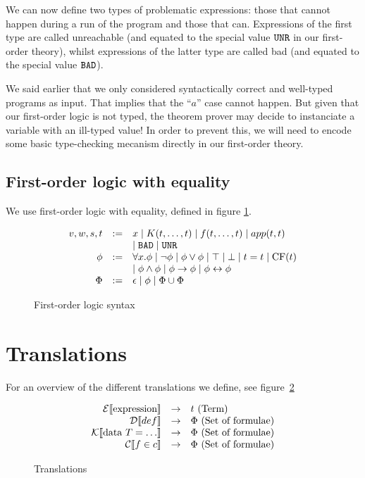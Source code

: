 \documentclass[preprint]{sigplanconf}
\begin{document}
We can now define two types of problematic expressions: those that
cannot happen during a run of the program and those that can.
Expressions of the first type are called unreachable (and equated to
the special value $\texttt{UNR}$ in our first-order theory), whilst
expressions of the latter type are called bad (and equated to the
special value $\texttt{BAD}$).

We said earlier that we only considered syntactically correct and
well-typed programs as input. That implies that the ``$a$'' case
cannot happen. But given that our first-order logic is not typed, the
theorem prover may decide to instanciate a variable with an ill-typed
value! In order to prevent this, we will need to encode some basic
type-checking mecanism directly in our first-order theory.


\subsection{First-order logic with equality}
We use first-order logic with equality, defined in figure \ref{fol-stx}.

\begin{figure}
 \centering
  \[  \begin{array}{rcl}
    v,w,s,t &:=& x \mid K(t,\dots,t) \mid f(t,\dots,t) \mid app(t,t)\\
    && \mid \texttt{BAD} \mid \texttt{UNR} \\
    \phi &:=& \forall x.\phi \mid \lnot \phi \mid \phi \lor \phi \mid \top \mid \bot \mid t=t \mid \mbox{CF}(t)\\
    && \mid \phi \land \phi \mid \phi \to \phi \mid \phi \leftrightarrow \phi \\
    \Phi &:=& \epsilon \mid \phi \mid \Phi \cup \Phi \\
  \end{array} \]
  \caption{First-order logic syntax}
  \label{fol-stx}
\end{figure}


\section{Translations}
For an overview of the different translations we define, see figure~\ref{trans}

\begin{figure}
 \begin{center}
  \[  \begin{array}{rcl}
    \mathcal{E} \llbracket \mbox{expression} \rrbracket &\to& t~(\mbox{Term}) \\
    \mathcal{D} \llbracket def \rrbracket &\to& \Phi~(\mbox{Set of formulae}) \\
    \mathcal{K} \llbracket \mbox{data } T = \dots \rrbracket &\to& \Phi~(\mbox{Set of formulae}) \\
    \mathcal{C} \llbracket f \in c \rrbracket &\to& \Phi~(\mbox{Set of formulae}) \\
  \end{array} \]
  \end{center}
  \caption{Translations}
  \label{trans}
\end{figure}
\end{document}
